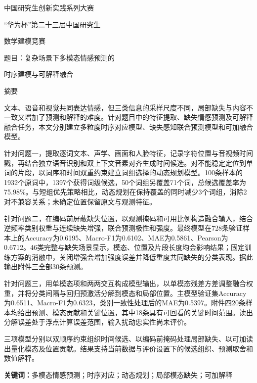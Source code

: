 \begin{center}
{\heiti{}中国研究生创新实践系列大赛\par}
\vspace{.4em}
{\heiti{}“华为杯”第二十三届中国研究生\par 数学建模竞赛\par}
\vspace{1em}
{\heiti{}题目：复杂场景下多模态情感预测的\par 时序建模与可解释融合\par}
\vspace{.7em}
{\heiti{}摘要}
\end{center}

文本、语音和视觉共同表达情感，但三类信息的采样尺度不同，局部缺失与内容不一致又增加了预测和解释的难度。针对题目中的特征提取、缺失情感预测及可解释融合任务，本文分别建立多粒度时序对应模型、缺失感知联合预测模型和可加融合模型。

针对问题一，提取逐词文本、声学、画面和人脸特征，记录字符位置与音视频时间戳，再结合独立语音识别和双上下文音素对齐生成时间候选。对不能稳定定位到单词的片段，以词序和时间双重约束建立词组选择的动态规划模型。100条样本的1932个原词中，1397个获得词级候选，50个词组另覆盖71个词，总候选覆盖率为75.98\%。与短组优先策略相比，动态规划在保持覆盖的同时减少3个词组，消除2对不兼容关系；未确定位置保留原文与观测特征。

针对问题二，在编码前屏蔽缺失位置，以观测掩码和可用比例构造融合输入，结合逆频率类别权重与连续缺失增强，联合预测极性和强度。最终模型在728条验证样本上的Accuracy为0.6195、Macro-F1为0.6102、MAE为0.5861、Pearson为0.6712。46类完整与缺失场景显示，模态、位置及片段长度均会影响结果；固定训练方案的消融中，关闭增强会增加强度误差并降低重度共同缺失的分类表现。据此输出附件三全部30条预测。

针对问题三，用单模态项和两两交互构成模型输出，以单模态残差方差调整融合权重，并将分类间隔与回归预激活分解到模态和局部位置。主模型验证集Accuracy为0.6511、Macro-F1为0.6323，类别一致性处理后的MAE为0.5397。附件四20条样本均给出预测、模态贡献和关键位置，其中18条具有可回看的关键时间范围。读出分解误差处于浮点计算误差范围，输入扰动忠实性尚未评价。

三项模型分别以双顺序约束组织时间候选、以编码前掩码处理局部缺失、以可加读出量化模态及位置贡献。结果支持当前数据与评价设置下的候选组织、预测取舍和数值解释。

\noindent\textbf{关键词：}多模态情感预测；时序对应；动态规划；局部模态缺失；可加解释
